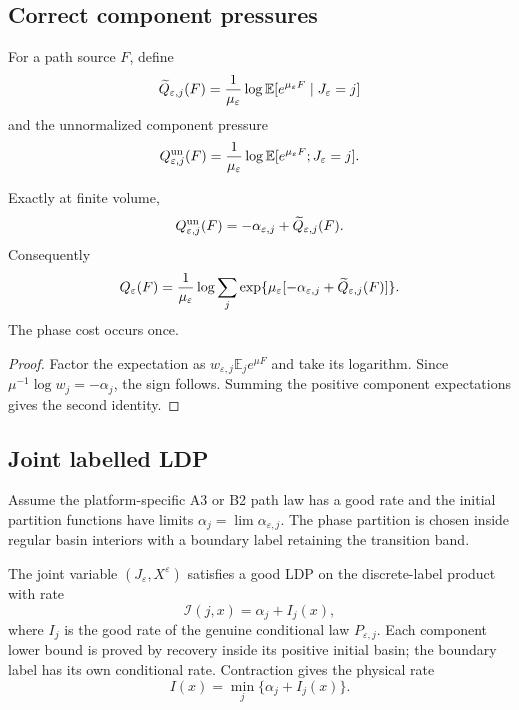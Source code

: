 \subsection{Correct component pressures}

For a path source \(F\), define
\[
 \widetilde Q_{\varepsilon,j}(F)
 ={1\over\mu_\varepsilon}
 \log\mathbb E[e^{\mu_\varepsilon F}\mid J_\varepsilon=j]
\]
and the unnormalized component pressure
\[
 Q^{\rm un}_{\varepsilon,j}(F)
 ={1\over\mu_\varepsilon}
 \log\mathbb E[e^{\mu_\varepsilon F};J_\varepsilon=j].
\]

\begin{lemma}
\label{lem:r16-d1-sign}
Exactly at finite volume,
\[
 Q^{\rm un}_{\varepsilon,j}(F)
 =-\alpha_{\varepsilon,j}
  +\widetilde Q_{\varepsilon,j}(F).
\]
Consequently
\[
 Q_\varepsilon(F)
 ={1\over\mu_\varepsilon}
 \log\sum_j
 \exp\{\mu_\varepsilon[-\alpha_{\varepsilon,j}
 +\widetilde Q_{\varepsilon,j}(F)]\}.
\]
The phase cost occurs once.
\end{lemma}

\begin{proof}
Factor the expectation as
\(w_{\varepsilon,j}\mathbb E_j e^{\mu F}\) and take its logarithm.  Since
\(\mu^{-1}\log w_j=-\alpha_j\), the sign follows.  Summing the positive
component expectations gives the second identity.
\end{proof}

\subsection{Joint labelled LDP}

Assume the platform-specific A3 or B2 path law has a good rate and the initial
partition functions have limits
\(\alpha_j=\lim\alpha_{\varepsilon,j}\).  The phase partition is chosen inside
regular basin interiors with a boundary label retaining the transition band.

\begin{theorem}
\label{thm:r16-d1-joint}
The joint variable \((J_\varepsilon,X^\varepsilon)\) satisfies a good LDP on
the discrete-label product with rate
\[
 \mathcal I(j,x)=\alpha_j+I_j(x),
\]
where \(I_j\) is the good rate of the genuine conditional law
\(P_{\varepsilon,j}\).  Each component lower bound is proved by recovery
inside its positive initial basin; the boundary label has its own conditional
rate.  Contraction gives the physical rate
\[
 I(x)=\min_j\{\alpha_j+I_j(x)\}.
\]
\end{theorem}

